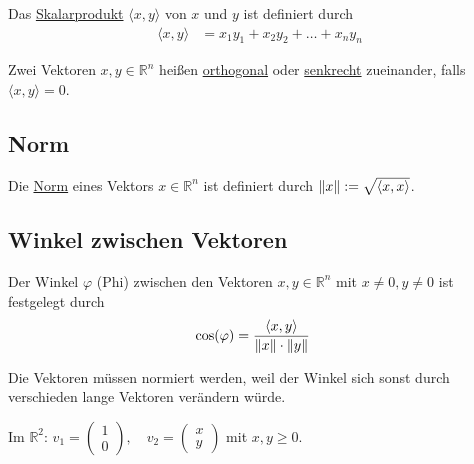 Das \underline{Skalarprodukt} $\langle x, y\rangle$ von $x$ und $y$ ist definiert durch
\begin{align*}
    \langle x, y\rangle &= x_1y_1 + x_2y_2 + \dots + x_ny_n
\end{align*}

Zwei Vektoren $x, y \in \mathbb{R}^n$ heißen \underline{orthogonal} oder \underline{senkrecht} zueinander, falls $\langle x, y\rangle = 0$.

\subsection{Norm}
Die \underline{Norm} eines Vektors $x \in \mathbb{R}^n$ ist definiert durch $\left\lVert x\right\rVert := \sqrt{\langle x, x\rangle}$.

\subsection{Winkel zwischen Vektoren}
Der Winkel $\varphi$ (Phi) zwischen den Vektoren $x, y \in \mathbb{R}^n$ mit $x\neq 0, y\neq 0$ ist festgelegt durch
\begin{align*}
    \text{cos}(\varphi) &= \frac{\langle x, y\rangle}{\left\lVert x\right\rVert\cdot\left\lVert y\right\rVert}
\end{align*}

\begin{center}
\end{center}
Die Vektoren müssen normiert werden, weil der Winkel sich sonst durch verschieden lange Vektoren verändern würde.

Im $\mathbb{R}^2$: $v_1 = \begin{pmatrix}1\\0\end{pmatrix},\quad v_2 = \begin{pmatrix}x\\y\end{pmatrix}$ mit $x, y \geq 0$.

